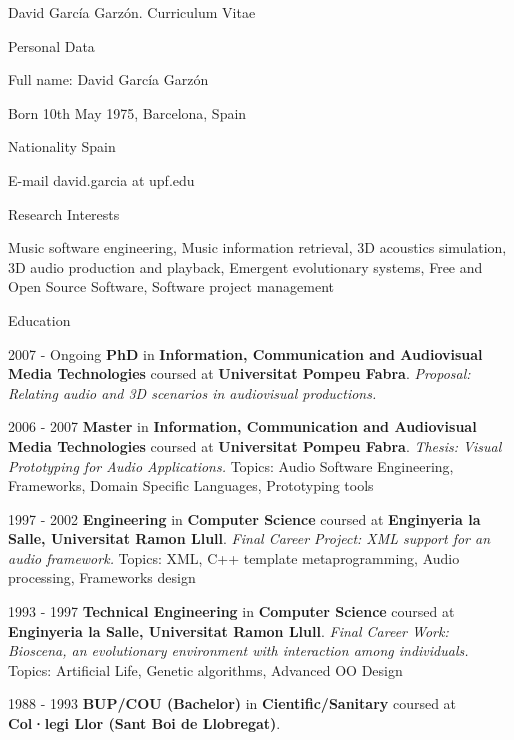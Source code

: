 \documentclass{article}
\begin{document}
\setlength{\cvlabelwidth}{45mm}

\begin{cv}{David García Garzón. Curriculum Vitae}

\begin{cvlist}{Personal Data}
\item[Full name:] David García Garzón
\item[Born] 10th May 1975, Barcelona, Spain
\item[Nationality] Spain
\item[E-mail] david.garcia at upf.edu
\end{cvlist}

\begin{cvlist}{Research Interests}
\item[] Music software engineering, Music information retrieval, 3D acoustics simulation, 3D audio production and playback, Emergent evolutionary systems, Free and Open Source Software, Software project management
\end{cvlist}

\begin{cvlist}{Education}

\item[2007 - Ongoing]
{\bf PhD} in {\bf Information, Communication and Audiovisual Media Technologies}
coursed at {\bf Universitat Pompeu Fabra}.
{\em Proposal: Relating audio and 3D scenarios in audiovisual productions.}
\item[2006 - 2007]
{\bf Master} in {\bf Information, Communication and Audiovisual Media Technologies}
coursed at {\bf Universitat Pompeu Fabra}.
{\em Thesis: Visual Prototyping for Audio Applications.}
Topics: Audio Software Engineering, Frameworks, Domain Specific Languages, Prototyping tools
\item[1997 - 2002]
{\bf Engineering} in {\bf Computer Science}
coursed at {\bf Enginyeria la Salle, Universitat Ramon Llull}.
{\em Final Career Project: XML support for an audio framework.}
Topics: XML, C++ template metaprogramming, Audio processing, Frameworks design
\item[1993 - 1997]
{\bf Technical Engineering} in {\bf Computer Science}
coursed at {\bf Enginyeria la Salle, Universitat Ramon Llull}.
{\em Final Career Work: Bioscena, an evolutionary environment with interaction among individuals.}
Topics: Artificial Life, Genetic algorithms, Advanced OO Design
\item[1988 - 1993]
{\bf BUP/COU (Bachelor)} in {\bf Cientific/Sanitary}
coursed at {\bf Col·legi Llor (Sant Boi de Llobregat)}.
{\em }
\end{cvlist}


\end{cv}
\end{document}
